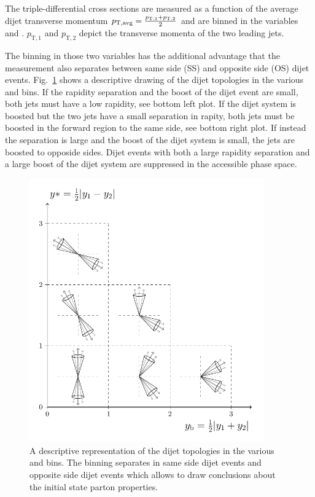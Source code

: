 The triple-differential cross sections are measured as a function of the average dijet
transverse momentum $p_{\mathrm{T,avg}} = \frac{p_{\mathrm{T},1} + p_{\mathrm{T},2}}{2}$ and
are binned in the variables \ystar and \yboost. $p_{\mathrm{T},1}$ and
$p_{\mathrm{T},2}$ depict the transverse momenta of the two leading jets. 

The binning in those two variables has the additional advantage that the
measurement also separates between same side (SS) and opposite side (OS) dijet
events. Fig.~\ref{fig:ysyb_schema} shows a descriptive drawing of the
dijet topologies in the various \ystar and \yboost bins. If the rapidity
separation and the boost of the dijet event are small, both jets must have a low
rapidity, see bottom left plot. If the dijet system is boosted but the two jets
have a small separation in rapity, both jets must be boosted in the forward region to
the same side, see bottom right plot. If instead the separation is large and the
boost of the dijet system is small, the jets are boosted to opposide
sides. Dijet events with both a large rapidity separation and a large boost of
the dijet system are suppressed in the accessible phase space.

\begin{figure}[htbp]
    \centering
    \includegraphics[width=0.9\textwidth]{figures/measurement/ybys.pdf}
    \caption[Dijet topologies in \ystar and \yboost phasespace]
        {A descriptive representation of the dijet topologies in the various
    \ystar and \yboost bins. The binning separates in same side dijet
    events and opposite side dijet events which allows to draw conclusions about
    the initial state parton properties.}
    \label{fig:ysyb_schema}
\end{figure}

